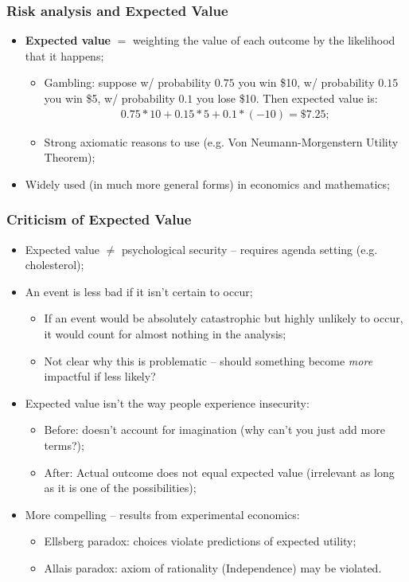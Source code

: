 \documentclass[aspectratio=169]{beamer}
\theoremstyle{principle}
\begin{document}
\begin{frame}
\frametitle{Risk analysis and Expected Value}
\begin{itemize}
\item \textbf{Expected value} $=$ weighting the value of each outcome by the likelihood that it happens;
\begin{itemize}
\item Gambling: suppose w/ probability $0.75$ you win \$10, w/ probability $0.15$ you win \$5, w/ probability $0.1$ you lose \$10.  Then expected value is:
\begin{align*}
0.75*10 + 0.15*5 + 0.1*(-10) = \mbox{\$}7.25;
\end{align*}
\item Strong axiomatic reasons to use (e.g. Von Neumann-Morgenstern Utility Theorem);
\end{itemize}
\bigskip
\bigskip
\bigskip
\item Widely used (in much more general forms) in economics and mathematics;
\end{itemize}
\end{frame}

\begin{frame}
\frametitle{Criticism of Expected Value}
\begin{itemize}
\item Expected value $\neq$ psychological security -- requires agenda setting (e.g. cholesterol);
\bigskip
\bigskip
\item An event is less bad if it isn't certain to occur;
\begin{itemize}
\item If an event would be absolutely catastrophic but highly unlikely to occur, it would count for almost nothing in the analysis;
\item Not clear why this is problematic -- should something become \textit{more} impactful if less likely?
\end{itemize}
\bigskip
\bigskip
\item Expected value isn't the way people experience insecurity:
\begin{itemize}
\item Before: doesn't account for imagination (why can't you just add more terms?);
\item After: Actual outcome does not equal expected value (irrelevant as long as it is one of the possibilities);
\end{itemize}
\bigskip
\bigskip
\item More compelling -- results from experimental economics:
\begin{itemize}
\item Ellsberg paradox: choices violate predictions of expected utility;
\item Allais paradox: axiom of rationality (Independence) may be violated.
\end{itemize}
\end{itemize}
\end{frame}
\end{document}
